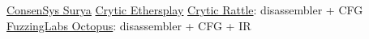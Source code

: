 \href{\urlcodesurya}{ConsenSys Surya}
\href{\urlcodeethersplay}{Crytic Ethersplay}
\href{\urlcoderattle}{Crytic Rattle}: disassembler + CFG
\href{\urlcodeoctopus}{FuzzingLabs Octopus}: disassembler + CFG + IR
